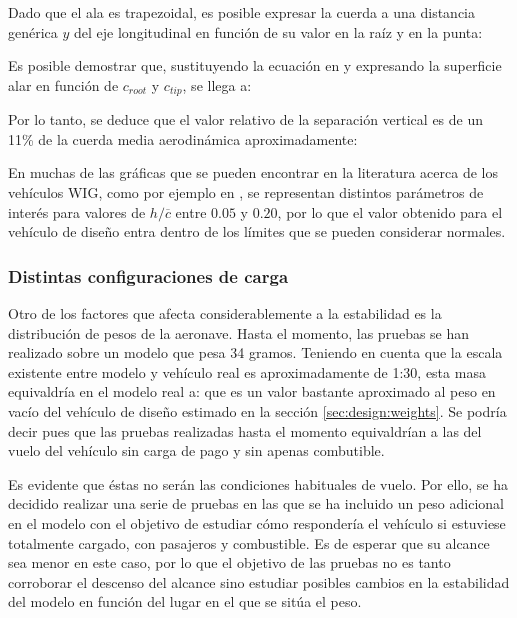 Dado que el ala es trapezoidal, es posible expresar la cuerda a una distancia genérica $y$ del eje longitudinal en función de su valor en la raíz y en la punta:

Es posible demostrar que, sustituyendo la ecuación  en  y expresando la superficie alar en función de $c_{root}$ y $c_{tip}$, se llega a:

Por lo tanto, se deduce que el valor relativo de la separación vertical es de un 11\% de la cuerda media aerodinámica aproximadamente:

En muchas de las gráficas que se pueden encontrar en la literatura acerca de los vehículos WIG, como por ejemplo en \cite{ref:wigpaper}, se representan distintos parámetros de interés para valores de $h/\overline{c}$ entre $0.05$ y $0.20$, por lo que el valor obtenido para el vehículo de diseño entra dentro de los límites que se pueden considerar normales.



\subsubsection{Distintas configuraciones de carga}
\label{sec:tests:results:weights}

Otro de los factores que afecta considerablemente a la estabilidad es la distribución de pesos de la aeronave. Hasta el momento, las pruebas se han realizado sobre un modelo que pesa 34 gramos. Teniendo en cuenta que la escala existente entre modelo y vehículo real es aproximadamente de 1:30, esta masa equivaldría en el modelo real a:
que es un valor bastante aproximado al peso en vacío del vehículo de diseño estimado en la sección \ref{sec:design:weights}. Se podría decir pues que las pruebas realizadas hasta el momento equivaldrían a las del vuelo del vehículo sin carga de pago y sin apenas combutible.

Es evidente que éstas no serán las condiciones habituales de vuelo. Por ello, se ha decidido realizar una serie de pruebas en las que se ha incluido un peso adicional en el modelo con el objetivo de estudiar cómo respondería el vehículo si estuviese totalmente cargado, con pasajeros y combustible. Es de esperar que su alcance sea menor en este caso, por lo que el objetivo de las pruebas no es tanto corroborar el descenso del alcance sino estudiar posibles cambios en la estabilidad del modelo en función del lugar en el que se sitúa el peso.

